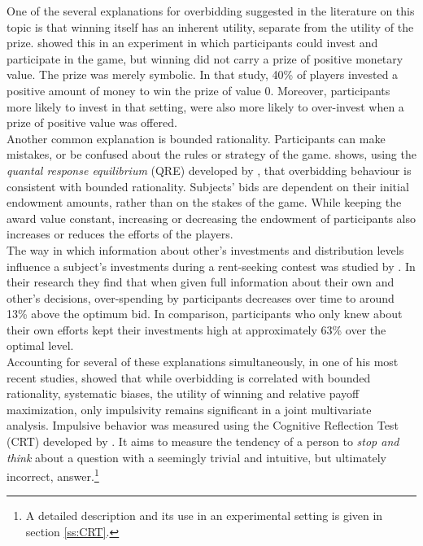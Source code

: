 One of the several explanations for overbidding suggested in the literature on this topic is that winning itself has an inherent utility, separate from the utility of the prize. \cite{sheremeta2010} showed this in an experiment in which participants could invest and participate in the game, but winning did not carry a prize of positive monetary value. The prize was merely symbolic. In that study, 40\% of players invested a positive amount of money to win the prize of value 0. Moreover, participants more likely to invest in that setting, were also more likely to over-invest when a prize of positive value was offered.\\

Another common explanation is bounded rationality. Participants can make mistakes, or be confused about the rules or strategy of the game. \cite{sheremeta2011} shows, using the \textit{quantal response equilibrium} (QRE) developed by \cite{mckelvey1995}, that overbidding behaviour is consistent with bounded rationality. Subjects' bids are dependent on their initial endowment amounts, rather than on the stakes of the game. While keeping the award value constant, increasing or decreasing the endowment of participants also increases or reduces the efforts of the players.\\ 

The way in which information about other's investments and distribution levels influence a subject's investments during a rent-seeking contest was studied by \cite{fallucchi2013}. In their research they find that when given full information about their own and other's decisions, over-spending by participants decreases over time to around 13\% above the optimum bid. In comparison, participants who only knew about their own efforts kept their investments high at approximately 63\% over the optimal level.\\

Accounting for several of these explanations simultaneously, in one of his most recent studies, \cite{sheremeta2016} showed that while overbidding is correlated with bounded rationality, systematic biases, the utility of winning and relative payoff maximization, only impulsivity remains significant in a joint multivariate analysis. Impulsive behavior was measured using the Cognitive Reflection Test (CRT) developed by \cite{frederick2005}. It aims to measure the tendency of a person to \textit{stop and think} about a question with a seemingly trivial and intuitive, but ultimately incorrect, answer.\footnote{A detailed description and its use in an experimental setting is given in section \ref{ss:CRT}.}\\

